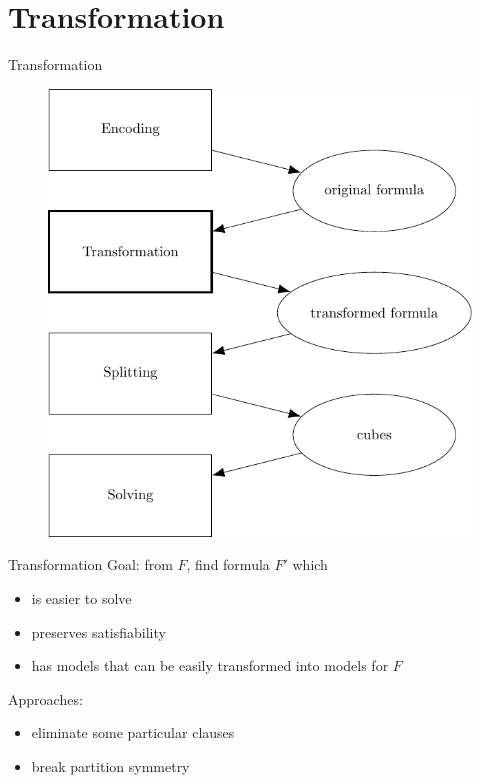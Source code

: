 \documentclass[c,8pt,xcolor...,x11names,usenames,dvipsnames]{beamer}
\begin{document}
\section{Transformation}

\begin{frame}{Transformation}
	\begin{figure}
		\includegraphics[scale=0.65]{images/framework2}
	\end{figure}
\end{frame}

\begin{frame}{Transformation}
	Goal: from $F$, find formula $F'$ which
	\begin{itemize}
		\item is easier to solve
		\pause
		\item preserves satisfiability
		\pause
		\item has models that can be easily transformed into models for $F$
	\end{itemize}
	\vspace{5px}
	\pause
	Approaches:
	\begin{itemize}
		\item eliminate some particular clauses
		\pause
		\item break partition symmetry
	\end{itemize}
\end{frame}
\end{document}
